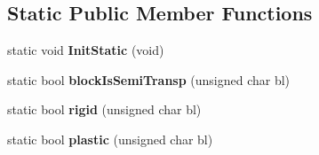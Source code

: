\subsection*{\-Static \-Public \-Member \-Functions}
\begin{DoxyCompactItemize}
\item 
\hypertarget{structChunkBlocks_ad7f0d73cb7a7ac9b9a0e9adbd78b1895}{static void {\bfseries \-Init\-Static} (void)}\label{structChunkBlocks_ad7f0d73cb7a7ac9b9a0e9adbd78b1895}

\item 
\hypertarget{structChunkBlocks_a15714b8cfd908d16ae64d2207d3abe75}{static bool {\bfseries block\-Is\-Semi\-Transp} (unsigned char bl)}\label{structChunkBlocks_a15714b8cfd908d16ae64d2207d3abe75}

\item 
\hypertarget{structChunkBlocks_a573e6f9e5c01366283ea2dbe4ce43914}{static bool {\bfseries rigid} (unsigned char bl)}\label{structChunkBlocks_a573e6f9e5c01366283ea2dbe4ce43914}

\item 
\hypertarget{structChunkBlocks_a33b837566d8159b2141e0310e15024a9}{static bool {\bfseries plastic} (unsigned char bl)}\label{structChunkBlocks_a33b837566d8159b2141e0310e15024a9}

\end{DoxyCompactItemize}
